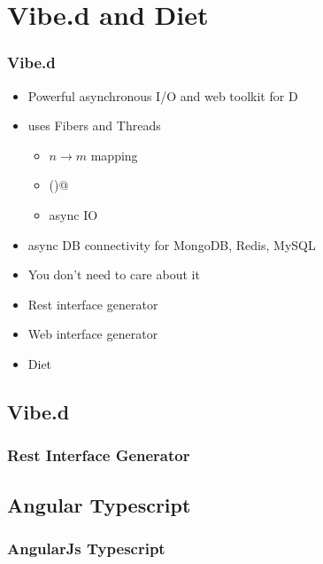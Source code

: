 \documentclass[xelatex,13pt]{beamer}
\begin{document}
\section{Vibe.d and Diet}
\begin{frame}
	\frametitle{Vibe.d}
	\begin{itemize}
		\item Powerful asynchronous I/O and web toolkit for D
		\item uses Fibers and Threads
			\pause
			\begin{itemize}
				\item \(n \rightarrow m\) mapping
				\item \lstinline@yield()@
				\item async IO
			\end{itemize}
			\pause
		\item async DB connectivity for MongoDB, Redis, MySQL
		\item You don't need to care about it
		\item Rest interface generator
		\item Web interface generator
		\item Diet
	\end{itemize}
\end{frame}

\subsection{Vibe.d}
\begin{frame}
	\frametitle{Rest Interface Generator}
	
	\pause
	
	\pause
	
\end{frame}

\subsection{Angular Typescript}
\begin{frame}
	\frametitle{AngularJs Typescript}
	
\end{frame}
\end{document}
